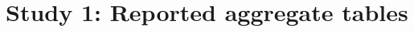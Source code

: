 \documentclass[11pt]{article}
\begin{document}
\section*{Study 1: Reported aggregate tables}

\end{document}
